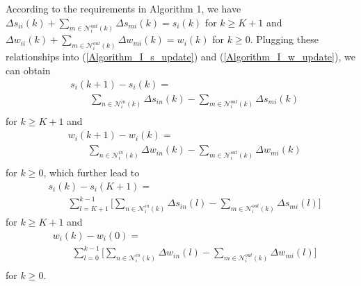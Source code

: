 \documentclass{IEEEtran}
\begin{document}
According to the requirements in Algorithm 1, we have $\Delta s_{ii}(k) + \sum_{m\in \mathcal{N}_i^{out}(k)}{\Delta s_{mi}(k)}=s_i(k)$ for $k \geq K+1$ and $\Delta w_{ii}(k) + \sum_{m\in \mathcal{N}_i^{out}(k)}{\Delta w_{mi}(k)}=w_i(k)$ for $k \geq 0$. Plugging these relationships into (\ref{Algorithm_I_s_update}) and (\ref{Algorithm_I_w_update}), we can obtain
\begin{equation}\label{eqn_theorem_3_4}
	\begin{aligned}
		& s_i(k+1)- s_i(k) = \\
		& \qquad \sum\limits_{n\in \mathcal{N}_i^{in}(k)}{\Delta s_{in}(k)} - \sum\limits_{m\in \mathcal{N}_i^{out}(k)}{\Delta s_{mi}(k)}\\
	\end{aligned}
\end{equation}
for $k \geq K+1$ and
\begin{equation}\label{eqn_theorem_3_5}
	\begin{aligned}
		& w_i(k+1)- w_i(k)= \\
		& \qquad \sum\limits_{n\in \mathcal{N}_i^{in}(k)}{\Delta w_{in}(k)} - \sum\limits_{m\in \mathcal{N}_i^{out}(k)}{\Delta w_{mi}(k)} \\
	\end{aligned}
\end{equation}
for $k \geq 0$, which further lead to
\begin{equation}\label{eqn_theorem_3_6}
	\begin{aligned}
		& s_i(k)- s_i(K+1)= \\
		& \qquad \sum\limits_{l=K+1}^{k-1} \Big[ \sum\limits_{n\in \mathcal{N}_i^{in}(k)}{\Delta s_{in}(l)} - \sum\limits_{m\in \mathcal{N}_i^{out}(k)}{\Delta s_{mi}(l)} \Big]
	\end{aligned}
\end{equation}
for $k \geq K+1$ and
\begin{equation}\label{eqn_theorem_3_7}
	\begin{aligned}
		& w_i(k)- w_i(0)= \\
		& \qquad \sum\limits_{l=0}^{k-1} \Big[ \sum\limits_{n\in \mathcal{N}_i^{in}(k)}{\Delta w_{in}(l)} - \sum\limits_{m\in \mathcal{N}_i^{out}(k)}{\Delta w_{mi}(l)} \Big]\\
	\end{aligned}
\end{equation}
for $k \geq 0$.
\end{document}

